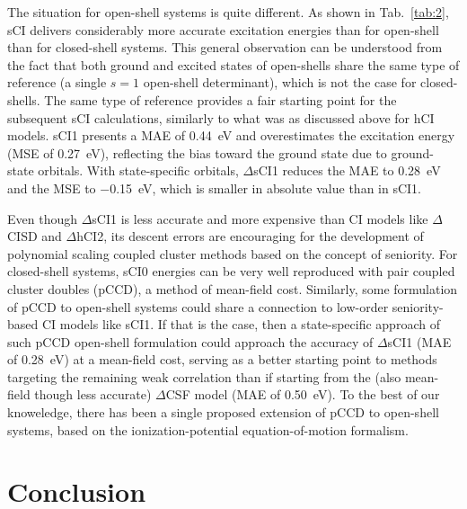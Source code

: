 \documentclass[aip,jcp,reprint,noshowkeys,superscriptaddress]{revtex4-1}
\begin{document}
The situation for open-shell systems is quite different.
As shown in Tab.~\ref{tab:2}, sCI delivers considerably more accurate excitation energies than for open-shell than for closed-shell systems.
This general observation can be understood from the fact that both ground and excited states of open-shells share the same type of reference (a single $s=1$ open-shell determinant),
which is not the case for closed-shells.
The same type of reference provides a fair starting point for the subsequent sCI calculations, similarly to what was as discussed above for hCI models.
sCI1 presents a MAE of \SI{0.44}{\eV} and overestimates the excitation energy (MSE of \SI{+0.27}{\eV}), reflecting the bias toward the ground state due to ground-state orbitals.
With state-specific orbitals, $\Delta$sCI1 reduces the MAE to \SI{0.28}{\eV} and the MSE to \SI{-0.15}{\eV}, which is smaller in absolute value than in sCI1.

Even though $\Delta$sCI1 is less accurate and more expensive than CI models like $\Delta$CISD and $\Delta$hCI2, 
its descent errors are encouraging for the development of polynomial scaling coupled cluster methods based on the concept of seniority.
For closed-shell systems, sCI0 energies can be very well reproduced with pair coupled cluster doubles (pCCD), \cite{Kossoski_2021} a method of mean-field cost.
Similarly, some formulation of pCCD to open-shell systems could share a connection to low-order seniority-based CI models like sCI1.
If that is the case, then a state-specific approach of such pCCD open-shell formulation could approach the accuracy of $\Delta$sCI1 (MAE of \SI{0.28}{\eV}) at a mean-field cost,
serving as a better starting point to methods targeting the remaining weak correlation than if starting from the (also mean-field though less accurate) $\Delta$CSF model (MAE of \SI{0.50}{\eV}).
To the best of our knoweledge, there has been a single proposed extension of pCCD to open-shell systems,
based on the ionization-potential equation-of-motion formalism. \cite{Boguslawski_2021}



\section{Conclusion}
\label{sec:ccl}

\end{document}
